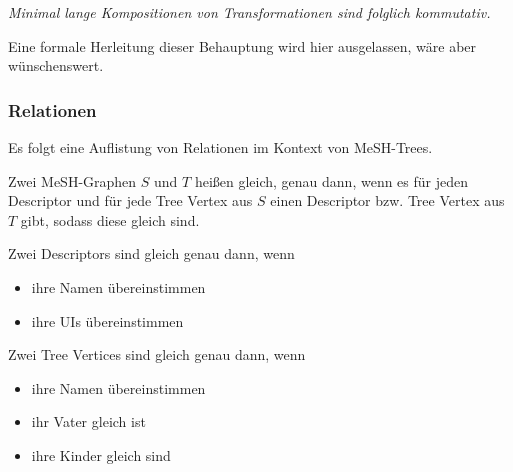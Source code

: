\textit{Minimal lange Kompositionen von Transformationen sind folglich kommutativ.}\par

Eine formale Herleitung dieser Behauptung wird hier ausgelassen, wäre aber wünschenswert.

\subsubsection{Relationen}
\label{sec:mesh_relationen}
Es folgt eine Auflistung von Relationen im Kontext von MeSH-Trees.

\begin{definition}
Zwei MeSH-Graphen $S$ und $T$ heißen gleich, genau dann, wenn es für jeden Descriptor und für jede Tree Vertex aus $S$ einen Descriptor bzw. Tree Vertex aus $T$ gibt, sodass diese gleich sind.
\end{definition}

\begin{definition}
Zwei Descriptors sind gleich genau dann, wenn 
\begin{itemize}
  \item ihre Namen übereinstimmen
  \item ihre UIs übereinstimmen
\end{itemize}
\end{definition}

\begin{definition}
Zwei Tree Vertices sind gleich genau dann, wenn
\begin{itemize}
  \item ihre Namen übereinstimmen
  \item ihr Vater gleich ist
  \item ihre Kinder gleich sind
\end{itemize}
\end{definition}

